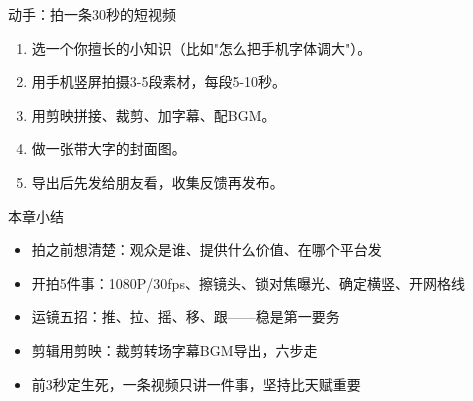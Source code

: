 \begin{tcbpractice}{动手：拍一条30秒的短视频}
\begin{enumerate}
  \item 选一个你擅长的小知识（比如"怎么把手机字体调大"）。
  \item 用手机竖屏拍摄3-5段素材，每段5-10秒。
  \item 用剪映拼接、裁剪、加字幕、配BGM。
  \item 做一张带大字的封面图。
  \item 导出后先发给朋友看，收集反馈再发布。
\end{enumerate}

\end{tcbpractice}

\begin{tcbsummary}{本章小结}
\begin{itemize}
  \item 拍之前想清楚：观众是谁、提供什么价值、在哪个平台发
  \item 开拍5件事：1080P/30fps、擦镜头、锁对焦曝光、确定横竖、开网格线
  \item 运镜五招：推、拉、摇、移、跟——稳是第一要务
  \item 剪辑用剪映：裁剪转场字幕BGM导出，六步走
  \item 前3秒定生死，一条视频只讲一件事，坚持比天赋重要
\end{itemize}

\end{tcbsummary}
